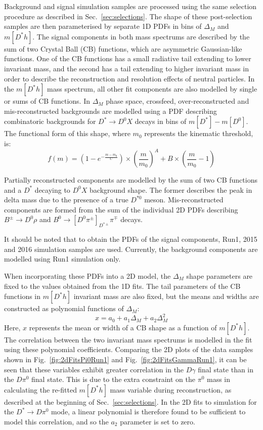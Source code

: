 \documentclass[oneside,12pt]{article}
\begin{document}
Background and signal simulation samples are processed using the same selection
procedure as described in Sec.~\ref{sec:selections}. The shape of these
post-selection samples are then parameterised by separate 1D PDFs in bins of
$\Delta_M$ and $m[D^*h]$. The signal components in both mass spectrums are
described by the sum of two Crystal Ball (CB) functions, which are asymmetric
Gaussian-like functions. One of the CB functions has a small radiative tail
extending to lower invariant mass, and the second has a tail extending to higher
invariant mass in order to describe the reconstruction and resolution effects of
neutral particles. In the $m[D^*h]$ mass spectrum, all other fit components are
also modelled by single or sums of CB functions. In $\Delta_M$ phase space,
crossfeed, over-reconstructed and mis-reconstructed backgrounds are modelled
using a PDF describing combinatoric backgrounds for $D^{*}\rightarrow D^{0}X$
decays in bins of $m[D^*]-m[D^0]$. The functional form of this shape, where $m_0$
represents the kinematic threshold, is:
\begin{equation}
f(m)=(1-e^{-\frac{m-m_0}{C}})\times(\frac{m}{m_0})^A+B\times(\frac{m}{m_0}-1)
\label{eq:DstD0BG}
\end{equation}

Partially reconstructed components are modelled by the sum of two CB functions
and a $D^*$ decaying to $D^0X$ background shape. The former describes the peak
in delta mass due to the presence of a true $D^{*0}$ meson. Mis-reconstructed
components are formed from the sum of the individual 2D PDFs describing
$B^{\pm}\rightarrow D^0\rho$ and
$B^{0}\rightarrow[D^0\pi^{\pm}]_{D^{*\pm}}\pi^{\mp}$ decays.

It should be noted that to obtain the PDFs of the signal components, Run1, 2015 and 2016 simulation samples are used. Currently, the background components are modelled using Run1 simulation only. 

When incorporating these PDFs into a 2D model, the $\Delta_M$ shape parameters
are fixed to the values obtained from the 1D fits. The tail parameters of the CB
functions in $m[D^*h]$ invariant mass are also fixed, but the means and widths
are constructed as polynomial functions of $\Delta_M$:  
\begin{equation}
x = a_0 + a_1 \Delta_M + a_2 \Delta_M^2
\label{eq:2dPolynomial}
\end{equation}
Here, $x$ represents the mean or width of a CB shape as a function of
$m[D^*h]$.  The correlation between the two invariant mass spectrums is
modelled in the fit using these polynomial coefficients. Comparing the 2D plots
of the data samples shown in Fig.~\ref{fig:2dFitsPi0Run1} and
Fig.~\ref{fig:2dFitsGammaRun1}, it can be seen that these variables exhibit
greater correlation in the $D\gamma$ final state than in the $D\pi^0$ final
state. This is due to the extra constraint on the $\pi^0$ mass in calculating
the re-fitted $m[D^*h]$ mass variable during reconstruction, as described at
the beginning of Sec.~\ref{sec:selections}. In the 2D fits to simulation for
the $D^*\rightarrow D\pi^0$ mode, a linear polynomial is therefore found to be
sufficient to model this correlation, and so the $a_2$ parameter is set to
zero.
\end{document}
